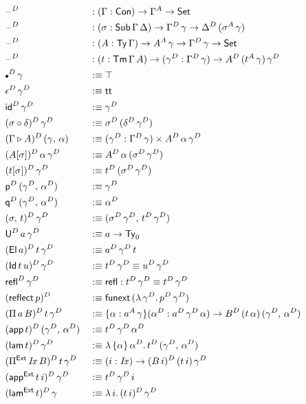\documentclass[12pt,a4paper,twoside,openany]{book}
\theoremstyle{remark}
\theoremstyle{definition}
\theoremstyle{theorem}
\newcommand{\mi}[1]{\mathit{#1}}
\newcommand{\ms}[1]{\mathsf{#1}}
\newcommand{\funext}{\ms{funext}}
\newcommand{\refl}{\mathsf{refl}}
\newcommand{\reflect}{\mathsf{reflect}}
\newcommand{\id}{\mathsf{id}}
\newcommand{\Con}{\mathsf{Con}}
\newcommand{\Sub}{\mathsf{Sub}}
\newcommand{\Tm}{\mathsf{Tm}}
\newcommand{\Ty}{\mathsf{Ty}}
\newcommand{\U}{\mathsf{U}}
\newcommand{\El}{\mathsf{El}}
\newcommand{\Id}{\mathsf{Id}}
\renewcommand{\tt}{\mathsf{tt}}
\newcommand{\blank}{\mathord{\hspace{1pt}\text{--}\hspace{1pt}}}
\newcommand{\Set}{\mathsf{Set}}
\newcommand{\ext}{\triangleright}
\newcommand{\emptycon}{\scaleobj{.75}\bullet}
\newcommand{\Pie}{\Pi^{\mathsf{Ext}}}
\newcommand{\appe}{\mathsf{app^{Ext}}}
\newcommand{\lame}{\mathsf{lam^{Ext}}}
\newcommand{\p}{\mathsf{p}}
\newcommand{\q}{\mathsf{q}}
\newcommand{\app}{\ms{app}}
\newcommand{\lam}{\ms{lam}}
\newcommand{\defn}{:\equiv}
\begin{document}
\begin{alignat*}{3}
  &\blank^D &&: (\Gamma : \Con) \to \Gamma^A \to \Set\\
  &\blank^D &&: (\sigma : \Sub\,\Gamma\,\Delta) \to \Gamma^D\,\gamma \to \Delta^D\,(\sigma^A\,\gamma) \\
  &\blank^D &&: (A : \Ty\,\Gamma) \to A^A\,\gamma \to \Gamma^D\,\gamma \to \Set\\
  &\blank^D &&: (t : \Tm\,\Gamma\,A) \to (\gamma^D : \Gamma^D\,\gamma) \to A^D\,(t^A\,\gamma)\,\gamma^D\\
  &\emptycon^D\,\gamma &&\defn \top\\
  &\epsilon^D\,\gamma^D &&\defn \tt\\
  &\id^D\,\gamma^D &&\defn \gamma^D\\
  &(\sigma \circ \delta)^D\,\gamma^D &&\defn \sigma^D\,(\delta^D\,\gamma^D)\\
  &(\Gamma \ext A)^D\,(\gamma,\,\alpha) &&\defn (\gamma^D : \Gamma^D\,\gamma) \times A^D\,\alpha\,\gamma^D\\
  &(A[\sigma])^D\,\alpha\,\gamma^D &&\defn A^D\,\alpha\,(\sigma^D\,\gamma^D)\\
  &(t[\sigma])^D\,\gamma^D &&\defn t^D\,(\sigma^D\,\gamma^D)\\
  &\p^D\,(\gamma^D,\,\alpha^D) &&\defn \gamma^D\\
  &\q^D\,(\gamma^D,\,\alpha^D) &&\defn \alpha^D\\
  &(\sigma,\,t)^D\,\gamma^D &&\defn (\sigma^D\,\gamma^D,\,t^D\,\gamma^D)\\
  &\U^D\,a\,\gamma^D &&\defn a \to \Ty_0\\
  &(\El\,a)^D\,t\,\gamma^D &&\defn a^D\,\gamma^D\,t\\
  &(\Id\,t\,u)^D\,\gamma^D &&\defn t^D\,\gamma^D \equiv u^D\,\gamma^D\\
  &\refl^D\,\gamma^D &&\defn \refl : t^D\,\gamma^D \equiv t^D\,\gamma^D\\
  &(\reflect\,p)^D &&\defn \funext\,(\lambda\,\gamma^D.\,p^D\,\gamma^D)\\
  &(\Pi\,a\,B)^D\,t\,\gamma^D &&\defn \{\alpha : a^A\,\gamma\}(\alpha^D : a^D\,\gamma^D\,\alpha)
    \to B^D\,(t\,\alpha)\,(\gamma^D,\,\alpha^D)\\
  &(\app\,t)^D\,(\gamma^D,\,\alpha^D) &&\defn t^D\,\gamma^D\,\alpha^D\\
  &(\lam\,t)^D\,\gamma^D &&\defn \lambda\,\{\alpha\}\,\alpha^D.\,t^D\,(\gamma^D,\,\alpha^D)\\
  &(\Pie\,\mi{Ix}\,B)^D\,t\,\gamma^D &&\defn (i : \mi{Ix}) \to (B\,i)^D\,(t\,i)\,\gamma^D\\
  &(\appe\,t\,i)^D\,\gamma^D &&\defn t^D\,\gamma^D\,i\\
  &(\lame\,t)^D\,\gamma &&\defn \lambda\,i.\,(t\,i)^D\,\gamma^D
\end{alignat*}
\end{document}
